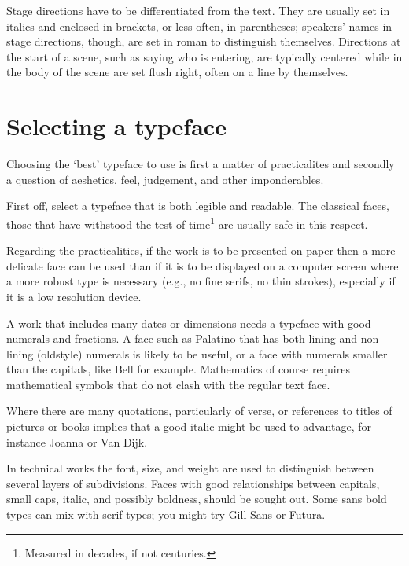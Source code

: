 \documentclass[10pt,letterpaper,extrafontsizes]{memoir}
\newcommand{\PWnote}[2]{}
\begin{document}
    Stage directions 
have to be differentiated from the text. They are usually set in italics 
and enclosed in brackets, or less often, in parentheses; speakers' names 
in stage directions, though, are set in roman to distinguish themselves. 
Directions at the start of a scene, such as saying who is entering, are 
typically centered while in the body of the scene are set flush right, 
often on a line by themselves.


\PWnote{2009/04/26}{Added section on selecting a typeface}
\section{Selecting a typeface}

    Choosing the `best' typeface to use is first a matter of practicalites
and secondly a question of aeshetics, feel, judgement, and other 
imponderables.

    First off, 
select a typeface that is both legible and readable.
The classical faces, those that have withstood the test of 
time\footnote{Measured in decades, if not centuries.} are
usually safe in this respect.

   Regarding the practicalities, 
if the work is to be presented on paper then
a more delicate face can be used than if it is to be displayed on a computer
screen where a more robust type is necessary (e.g., no fine serifs, no 
thin strokes), especially if it is a low resolution device.

  A work that includes many dates or dimensions needs a typeface with good
numerals and fractions. A face such as Palatino
 that has both lining and non-lining (oldstyle)
numerals is likely to be useful, or a face with numerals smaller than the
capitals, like Bell for example. Mathematics of course requires mathematical
symbols that do not clash with the regular text face.

    Where there are many quotations, particularly of verse, or references 
to titles of pictures or books implies that a good italic might be used
to advantage, for instance Joanna or 
Van Dijk.

    In technical works the font, size, and weight are used to distinguish 
between several layers of subdivisions. Faces with good relationships between
capitals, small caps, italic, and possibly boldness, should be sought out.  
Some sans bold types can mix with serif types; you might try 
Gill Sans or Futura.
\end{document}

